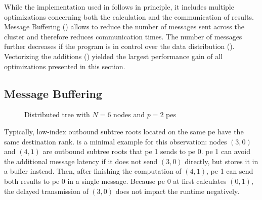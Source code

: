 While the implementation used in  follows  in principle, it includes multiple optimizations concerning both the calculation and the communication of results.
Message Buffering () allows to reduce the number of messages sent across the cluster and therefore reduces communication times.
The number of messages further decreases if the program is in control over the data distribution ().
Vectorizing the additions () yielded the largest performance gain of all optimizations presented in this section.

\subsection{Message Buffering}
\label{sec:MessageBuffering}

\begin{figure}[H]
\centering
{}
\caption{Distributed tree with $N=6$ nodes and $p=2$ \glspl{pe}}
\label{fig:messageBufferingTree}
\end{figure}

Typically, low-index outbound subtree roots located on the same \gls{pe} have the same destination rank.
 is a minimal example for this observation: nodes $(3,0)$ and $(4,1)$ are outbound subtree roots that \gls{pe} 1 sends to \gls{pe} 0.
\gls{pe} 1 can avoid the additional message latency if it does not send $(3,0)$ directly, but stores it in a buffer instead.
Then, after finishing the computation of $(4,1)$, \gls{pe} 1 can send both results to \gls{pe} 0 in a single message.
Because \gls{pe} 0 at first calculates $(0,1)$, the delayed transmission of $(3,0)$ does not impact the runtime negatively.

